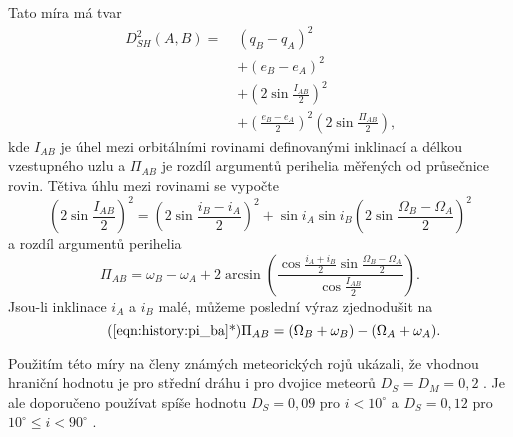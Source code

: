 Tato míra má tvar \cite{dsh}\cite{remarks}
\begin{equation}
    \begin{aligned}
        D_{SH}^2(A,B)=\; & (q_B-q_A)^2                                                                         \\
                         & +(e_B-e_A)^2                                                                        \\
                         & +\left( 2\sin{\frac{I_{AB}}{2}} \right)^2                                           \\
                         & +\left( \frac{e_B-e_A}{2} \right)^2\left( 2\sin{\frac{\Pi_{AB}}{2}} \right)\text{,}
    \end{aligned}
\end{equation}
kde $I_{AB}$ je úhel mezi orbitálními rovinami definovanými inklinací a délkou vzestupného uzlu a $\Pi_{AB}$ je rozdíl argumentů perihelia měřených od průsečnice rovin. Tětiva úhlu mezi rovinami se vypočte \cite{dsh}
\begin{equation}
    \left( 2\sin{\frac{I_{AB}}{2}} \right)^2=\left( 2\sin{\frac{i_B-i_A}{2}} \right)^2
    + \sin{i_A}\sin{i_B}\left( 2\sin{\frac{\Omega_B-\Omega_A}{2}} \right)^2
\end{equation}
a rozdíl argumentů perihelia \cite{dsh}
\begin{equation}
    \Pi_{AB}=\omega_B-\omega_A+2\arcsin{\left( \frac{\cos{\frac{i_A+i_B}{2}}\sin{\frac{\Omega_B-\Omega_A}{2}}}{\cos{\frac{I_{AB}}{2}}} \right)} \text{.}
    \label{eqn:history:pi_ba}
\end{equation}
Jsou-li inklinace $i_A$ a $i_B$ malé, můžeme poslední výraz zjednodušit na \cite{dsh}
\begin{equation}
    \tag{\ref{eqn:history:pi_ba}*}
    \Pi_{AB}=(\Omega_B+\omega_B)-(\Omega_A+\omega_A) \text{.}
\end{equation}

Použitím této míry na členy známých meteorických rojů \citeauthor{dsh} ukázali, že vhodnou hraniční hodnotu je pro střední dráhu i pro dvojice meteorů $D_S=D_M=0{,}2$ \cite{dsh}. Je ale doporučeno používat spíše hodnotu $D_S=0{,}09$ pro $i<10^\circ$ a $D_S=0{,}12$ pro $10^\circ\le i<90^\circ$ \cite{galligan}.